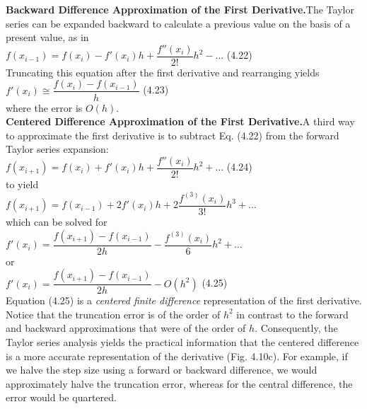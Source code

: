 \documentclass[../main.tex]{subfiles}
\begin{document}
\noindent\textbf{Backward Difference Approximation of the First Derivative.}\quad The Taylor series can be
expanded backward to calculate a previous value on the basis of a present value, as in\\

$f(x_{i-1}) = f(x_i)-f'(x_i)h+\dfrac{f''(x_i)}{2!}h^2-\hdots$
\hfill
(4.22)\\

\noindent
Truncating this equation after the first derivative and rearranging yields\\

$f'(x_i)\cong \dfrac{f(x_i)-f(x_{i-1})}{h}$
\hfill
(4.23)\\

\noindent
where the error is $O(h)$.\\

\noindent
\textbf{Centered Difference Approximation of the First Derivative.}\quad A third way to approximate
the first derivative is to subtract Eq. (4.22) from the forward Taylor series expansion:\\

$f(x_{i+1})=f(x_i)+f'(x_i)h + \dfrac{f''(x_i)}{2!}h^2 + \hdots$
\hfill
(4.24)\\

\noindent
to yield\\

$f(x_{i+1})=f(x_{i-1})+2f'(x_i)h + 2\dfrac{f^{(3)}(x_i)}{3!}h^3 + \hdots$\\

\noindent
which can be solved for\\

$f'(x_i)=\dfrac{f(x_{i+1})-f(x_{i-1})}{2h}-\dfrac{f^{(3)}(x_i)}{6}h^2+\hdots$\\

\noindent
or\\

$f'(x_i) = \dfrac{f(x_{i+1})-f(x_{i-1})}{2h}-O(h^2)$
\hfill
(4.25)\\

Equation (4.25) is a \emph{centered finite difference} representation of the first derivative.
Notice that the truncation error is of the order of $h^2$ in contrast to the forward and backward
approximations that were of the order of $h$. Consequently, the Taylor series analysis yields
the practical information that the centered difference is a more accurate representation of
the derivative (Fig. 4.10c). For example, if we halve the step size using a forward or backward
difference, we would approximately halve the truncation error, whereas for the central
difference, the error would be quartered.\\
\end{document}
